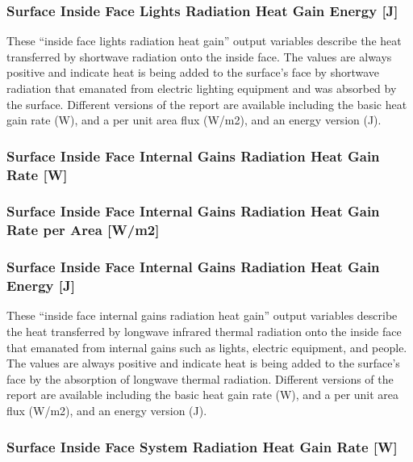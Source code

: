 \subsubsection{Surface Inside Face Lights Radiation Heat Gain Energy {[}J{]}}\label{surface-inside-face-lights-radiation-heat-gain-energy-j}

These ``inside face lights radiation heat gain'' output variables describe the heat transferred by shortwave radiation onto the inside face. The values are always positive and indicate heat is being added to the surface's face by shortwave radiation that emanated from electric lighting equipment and was absorbed by the surface. Different versions of the report are available including the basic heat gain rate (W), and a per unit area flux (W/m2), and an energy version (J).

\subsubsection{Surface Inside Face Internal Gains Radiation Heat Gain Rate {[}W{]}}\label{surface-inside-face-internal-gains-radiation-heat-gain-rate-w}

\subsubsection{Surface Inside Face Internal Gains Radiation Heat Gain Rate per Area {[}W/m2{]}}\label{surface-inside-face-internal-gains-radiation-heat-gain-rate-per-area-wm2}

\subsubsection{Surface Inside Face Internal Gains Radiation Heat Gain Energy {[}J{]}}\label{surface-inside-face-internal-gains-radiation-heat-gain-energy-j}

These ``inside face internal gains radiation heat gain'' output variables describe the heat transferred by longwave infrared thermal radiation onto the inside face that emanated from internal gains such as lights, electric equipment, and people. The values are always positive and indicate heat is being added to the surface's face by the absorption of longwave thermal radiation. Different versions of the report are available including the basic heat gain rate (W), and a per unit area flux (W/m2), and an energy version (J).

\subsubsection{Surface Inside Face System Radiation Heat Gain Rate {[}W{]}}\label{surface-inside-face-system-radiation-heat-gain-rate-w}

